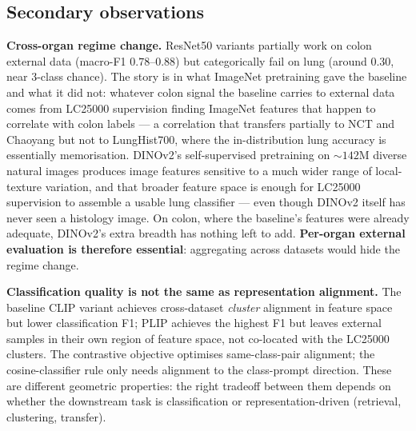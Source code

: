 \subsection{Secondary observations}

\textbf{Cross-organ regime change.} ResNet50 variants partially work on colon external data (macro-F1 $0.78$--$0.88$) but categorically fail on lung (around $0.30$, near 3-class chance). The story is in what ImageNet pretraining gave the baseline and what it did not: whatever colon signal the baseline carries to external data comes from LC25000 supervision finding ImageNet features that happen to correlate with colon labels --- a correlation that transfers partially to NCT and Chaoyang but not to LungHist700, where the in-distribution lung accuracy is essentially memorisation. DINOv2's self-supervised pretraining on $\sim 142$M diverse natural images produces image features sensitive to a much wider range of local-texture variation, and that broader feature space is enough for LC25000 supervision to assemble a usable lung classifier --- even though DINOv2 itself has never seen a histology image. On colon, where the baseline's features were already adequate, DINOv2's extra breadth has nothing left to add. \textbf{Per-organ external evaluation is therefore essential}: aggregating across datasets would hide the regime change.

\textbf{Classification quality is not the same as representation alignment.} The baseline CLIP variant achieves cross-dataset \emph{cluster} alignment in feature space but lower classification F1; PLIP achieves the highest F1 but leaves external samples in their own region of feature space, not co-located with the LC25000 clusters. The contrastive objective optimises same-class-pair alignment; the cosine-classifier rule only needs alignment to the class-prompt direction. These are different geometric properties: the right tradeoff between them depends on whether the downstream task is classification or representation-driven (retrieval, clustering, transfer).

